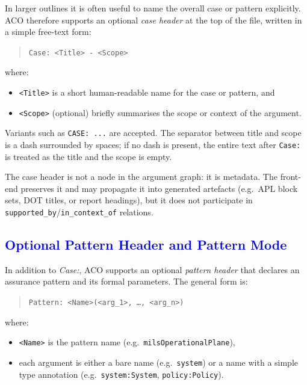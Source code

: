 \documentclass[11pt]{article}
\begin{document}
\begingroup
\color{blue}
In larger outlines it is often useful to name the overall case or pattern explicitly. ACO therefore supports an optional \emph{case header} at the top of the file, written in a simple free-text form:

\begin{quote}
\texttt{Case: \textless Title\textgreater{} - \textless Scope\textgreater}
\end{quote}

where:
\begin{itemize}[leftmargin=2em]
  \item \texttt{\textless Title\textgreater{}} is a short human-readable name for the case or pattern, and
  \item \texttt{\textless Scope\textgreater{}} (optional) briefly summarises the scope or context of the argument.
\end{itemize}

Variants such as \texttt{CASE: ...} are accepted. The separator between title and scope is a dash surrounded by spaces; if no dash is present, the entire text after \texttt{Case:} is treated as the title and the scope is empty.

The case header is not a node in the argument graph: it is metadata. The front-end preserves it and may propagate it into generated artefacts (e.g.\ APL block sets, DOT titles, or report headings), but it does not participate in \texttt{supported\_by}/\texttt{in\_context\_of} relations.
\endgroup

\subsection{\textcolor{blue}{Optional Pattern Header and Pattern Mode}}

\begingroup
\color{blue}
In addition to \emph{Case:}, ACO supports an optional \emph{pattern header} that declares an assurance pattern and its formal parameters. The general form is:

\begin{quote}
\texttt{Pattern: \textless Name\textgreater(\textless arg\_1\textgreater, \dots, \textless arg\_n\textgreater)}
\end{quote}

where:
\begin{itemize}[leftmargin=2em]
  \item \texttt{\textless Name\textgreater{}} is the pattern name (e.g.\ \texttt{milsOperationalPlane}),
  \item each argument is either a bare name (e.g.\ \texttt{system}) or a name with a simple type annotation (e.g.\ \texttt{system:System}, \texttt{policy:Policy}).
\end{itemize}
\end{document}
